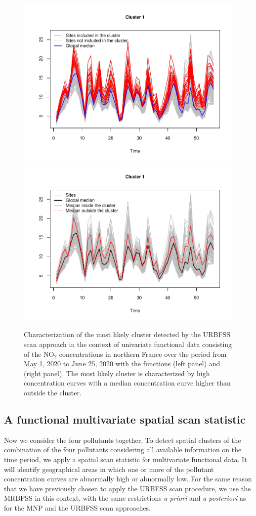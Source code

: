 \begin{figure}[htbp]
\centering
\includegraphics[width=0.49\linewidth]{curves_urbfss.pdf}
\includegraphics[width=0.49\linewidth]{summary_urbfss.pdf}
\caption{Characterization of the most likely cluster detected by the URBFSS scan approach in the context of univariate functional data consisting of the $\text{NO}_2$ concentrations in northern France over the period from May 1, 2020 to June 25, 2020 with the functions  (left panel) and  (right panel).
The most likely cluster is characterized by high concentration curves with a median concentration curve higher than outside the cluster.
}
\label{fig:curves}
\end{figure}

\subsection{A functional multivariate spatial scan statistic}

Now we consider the four pollutants together. To detect spatial clusters of the combination of the four pollutants considering all available information on the time period, we apply a spatial scan statistic for multivariate functional data. It will identify geographical areas in which one or more of the pollutant concentration curves are abnormally high or abnormally low. For the same reason that we have previously chosen to apply the URBFSS scan procedure, we use the MRBFSS in this context, with the same restrictions \textit{a priori} and \textit{a posteriori} as for the MNP and the URBFSS scan approaches.


